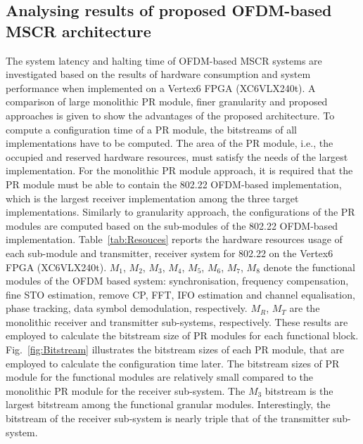 \subsection{Analysing results of proposed OFDM-based MSCR architecture}
The system latency and halting time of OFDM-based MSCR systems are investigated based on the results of hardware consumption and system performance when implemented on a Vertex6 FPGA (XC6VLX240t). 
A comparison of large monolithic PR module, finer granularity and proposed approaches is given to show the advantages of the proposed architecture. 
To compute a configuration time of a PR module, the bitstreams of all implementations have to be computed. 
The area of the PR module, i.e., the occupied and reserved hardware resources, must satisfy the needs of the largest implementation. 
For the monolithic PR module approach, it is required that the PR module must be able to contain the 802.22 OFDM-based  implementation, which is the largest receiver implementation among the three target implementations. Similarly to granularity approach, the configurations of the PR modules are computed based on the sub-modules of the 802.22 OFDM-based  implementation.
Table~\ref{tab:Resouces} reports the hardware resources usage of each sub-module and transmitter, receiver system for 802.22 on the Vertex6 FPGA (XC6VLX240t). $M_1$, $M_2$, $M_3$, $M_4$, $M_5$, $M_6$, $M_7$, $M_8$  denote the functional modules of the OFDM based system: synchronisation, frequency compensation, fine STO estimation, remove CP, FFT, IFO estimation and channel equalisation, phase tracking, data symbol demodulation, respectively. $M_R$, $M_T$ are the monolithic receiver and transmitter sub-systems, respectively.
These results are employed to calculate the bitstream size of PR modules for each functional block. Fig.~\ref{fig:Bitstream} illustrates the bitstream sizes of each PR module, that are employed to calculate the configuration time later. The bitstream sizes of PR module for the functional modules are relatively small compared to the monolithic PR module for the receiver sub-system. The $M_3$ bitstream is the largest bitstream among the functional granular modules. Interestingly, the bitstream of the receiver sub-system is nearly triple that of the transmitter sub-system.
